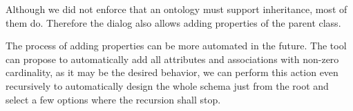 Although we did not enforce that an ontology must support inheritance, most of them do. Therefore the dialog also allows adding properties of the parent class.

\medskip

The process of adding properties can be more automated in the future. The tool can propose to automatically add all attributes and associations with non-zero cardinality, as it may be the desired behavior, we can perform this action even recursively to automatically design the whole schema just from the root and select a few options where the recursion shall stop.